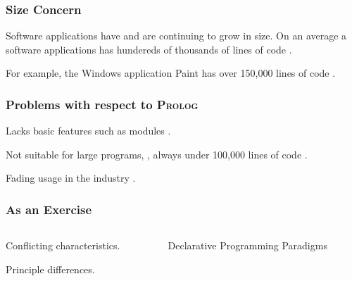 \documentclass[aspectratio=1610]{beamer}
\begin{document}

\begin{frame}
\frametitle{Size Concern}
Software applications have and are continuing to grow in size. On an average a software applications has hundereds of thousands of lines of code \cite{codebases}. \href{http://www.informationisbeautiful.net/visualizations/million-lines-of-code/}{}

For example, the Windows application Paint has over 150,000 lines of code \cite{paintwiki}. 

\end{frame}

\begin{frame}
\frametitle{Problems with respect to \textsc{Prolog}}
Lacks basic features such as modules \cite{prologwiki}.

Not suitable for large programs, \cite{somogyi1995logic}, always under 100,000 lines of code \cite{prolog1000db}.
 
Fading usage in the industry \cite{website:prolog-death, website:prolog-killer, website:prolog-steam}. 
\end{frame}



\begin{frame}
\frametitle{As an Exercise}

\begin{columns}[T]
  \begin{column}{0.5\textwidth}
   \begin{block}
	
	  Conflicting characteristics.
		
    Principle differences. 
		
		
   \end{block}
  \end{column}

  \begin{column}{0.5\textwidth}
	\begin{figure}
\caption{Declarative Programming Paradigms \cite{declarprogwiki}}
\end{figure}
  \end{column}
 \end{columns}
\end{frame}
\end{document}
